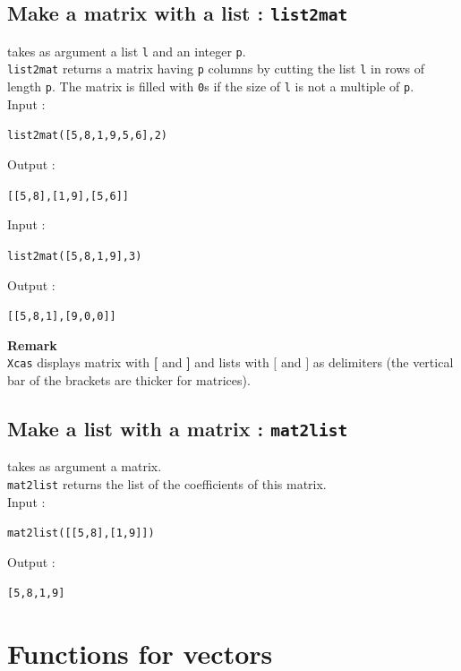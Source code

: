 \documentclass[a4paper,11pt]{book}
\begin{document}
\subsection{Make a matrix with a list : {\tt list2mat}}
 takes as argument a list {\tt l} and an integer 
{\tt p}.\\
{\tt list2mat} returns a matrix having {\tt p} columns 
by cutting the list {\tt l} in rows of length {\tt p}. 
The matrix is filled with {\tt 0}s if the size of {\tt l} is not
a multiple of {\tt p}.\\
Input :
\begin{center}{\tt list2mat([5,8,1,9,5,6],2)}\end{center}
Output :
\begin{center}{\tt  [[5,8],[1,9],[5,6]]}\end{center}
Input :
\begin{center}{\tt list2mat([5,8,1,9],3)}\end{center}
Output :
\begin{center}{\tt  [[5,8,1],[9,0,0]]}\end{center}
{\bf Remark} \\
{\tt Xcas} displays matrix with {\bf[} and  {\bf]} and lists with $[$ and  $]$ 
as delimiters (the vertical bar of the brackets are thicker for matrices). 

\subsection{Make a list with a matrix : {\tt mat2list}}
  takes as argument a matrix.\\
{\tt mat2list} returns the list of the coefficients of this matrix.\\
Input :
\begin{center}{\tt mat2list([[5,8],[1,9]])}\end{center}
Output :
\begin{center}{\tt [5,8,1,9]}\end{center}

\section{Functions for vectors}
\end{document}
